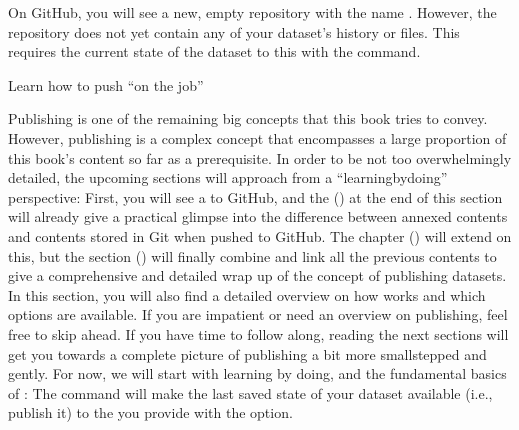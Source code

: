 \ignorespaces 
\sphinxAtStartPar
On GitHub, you will see a new, empty repository with the name
. However, the repository does not yet contain
any of your dataset’s history or files. This requires  the current
state of the dataset to this {\hyperref[\detokenize{glossary:term-sibling}]{}} with the 
command.
\begin{importantnote}[before title={\thetcbcounter\ }, check odd page=true]{Learn how to push “on the job”}

\sphinxAtStartPar
Publishing is one of the remaining big concepts that this book tries to
convey. However, publishing is a complex concept that encompasses a large
proportion of this book’s content so far as a prerequisite. In order to be
not too overwhelmingly detailed, the upcoming sections will approach
 from a “learning\sphinxhyphen{}by\sphinxhyphen{}doing” perspective:
First, you will see a  to GitHub, and the {\hyperref[\detokenize{basics/101-130-yodaproject:fom-midtermclone}]{}} ()
at the end of this section will already give a practical glimpse into the
difference between annexed contents and contents stored in Git when pushed
to GitHub. The chapter {\hyperref[\detokenize{basics/basics-thirdparty:chapter-thirdparty}]{}} () will extend on this,
but the section {\hyperref[\detokenize{basics/101-141-push:push}]{}} ()
will finally combine and link all the previous contents to give a comprehensive
and detailed wrap up of the concept of publishing datasets. In this section,
you will also find a detailed overview on how  works and which
options are available. If you are impatient or need an overview on publishing,
feel free to skip ahead. If you have time to follow along, reading the next
sections will get you towards a complete picture of publishing a bit more
small\sphinxhyphen{}stepped and gently.
For now, we will start with learning by doing, and
the fundamental basics of : The command
will make the last saved state of your dataset available (i.e., publish it)
to the {\hyperref[\detokenize{glossary:term-sibling}]{}} you provide with the  option.


\end{importantnote}

